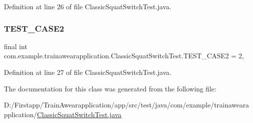 Definition at line 26 of file Classic\+Squat\+Switch\+Test.\+java.

\mbox{\label{classcom_1_1example_1_1trainawearapplication_1_1_classic_squat_switch_test_adfafc37af9e307475f809327d404008d}} 
\subsubsection{\texorpdfstring{TEST\_CASE2}{TEST\_CASE2}}
{\footnotesize\ttfamily final int com.\+example.\+trainawearapplication.\+Classic\+Squat\+Switch\+Test.\+T\+E\+S\+T\+\_\+\+C\+A\+S\+E2 = 2\hspace{0.3cm}{\ttfamily [static]}, {\ttfamily [private]}}



Definition at line 27 of file Classic\+Squat\+Switch\+Test.\+java.



The documentation for this class was generated from the following file\+:\begin{DoxyCompactItemize}
\item 
D\+:/\+Firstapp/\+Train\+Awearapplication/app/src/test/java/com/example/trainawearapplication/\mbox{\hyperlink{_classic_squat_switch_test_8java}{Classic\+Squat\+Switch\+Test.\+java}}\end{DoxyCompactItemize}
